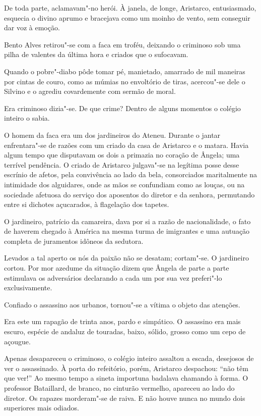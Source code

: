 De toda parte, aclamavam"-no herói. À janela,
de longe, Aristarco, entusiasmado, esquecia o divino aprumo e bracejava
como um moinho de vento, sem conseguir dar voz à emoção. 

Bento Alves
retirou"-se com a faca em troféu, deixando o criminoso sob uma pilha
de valentes da última hora e criados que o sufocavam. 

Quando o
pobre"-diabo pôde tomar pé, manietado, amarrado de mil maneiras por
cintas de couro, como as múmias no envoltório de tiras, acercou"-se
dele o Silvino e o agrediu covardemente com sermão de moral. 

Era criminoso dizia"-se. De que crime? Dentro de alguns momentos o colégio
inteiro o sabia. 

O homem da faca era um dos jardineiros do Ateneu.
Durante o jantar enfrentara"-se de razões com um criado da casa de
Aristarco e o matara. Havia algum tempo que disputavam os dois a
primazia no coração de Ângela; uma terrível pendência. O criado de
Aristarco julgava"-se na legítima posse desse escrínio de afetos, pela
convivência ao lado da bela, consorciados maritalmente na intimidade
dos alguidares, onde as mãos se confundiam como as louças, ou na
sociedade afetuosa do serviço dos aposentos do diretor e da senhora,
permutando entre si dichotes açucarados, à flagelação dos tapetes. 

O jardineiro, patrício da camareira, dava por si a razão de
nacionalidade, o fato de haverem chegado à América na mesma turma de
imigrantes e uma autuação completa de juramentos idôneos da sedutora.

Levados a tal aperto os nós da paixão não se desatam; cortam"-se. O
jardineiro cortou. Por mor azedume da situação dizem que Ângela de
parte a parte estimulava os adversários declarando a cada um por sua 
vez preferi"-lo exclusivamente. 

Confiado o assassino aos
urbanos, tornou"-se a vítima o objeto das atenções. 

Era este um
rapagão de trinta anos, pardo e simpático. O assassino era mais escuro,
espécie de andaluz de touradas, baixo, sólido, grosso como um cepo de
açougue. 

Apenas desapareceu o criminoso, o colégio inteiro assaltou a
escada, desejosos de ver o assassinado. À porta do refeitório, porém,
Aristarco despachou: ``não têm que ver!'' Ao mesmo tempo a sineta
importuna badalava chamando à forma. O professor Bataillard, de branco,
no cinturão vermelho, apareceu ao lado do diretor. Os rapazes
morderam"-se de raiva. E não houve nunca no mundo dois superiores mais
odiados. 

